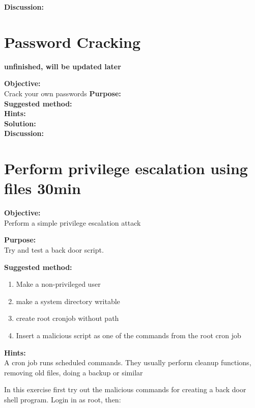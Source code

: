 \documentclass[a4paper,11pt,notitlepage]{report}
\begin{document}
{\bf Discussion:}\\


\chapter{Password Cracking}
\label{ex:pwcrack-101}

{\bf unfinished, will be updated later}

{\bf Objective:}\\

Crack your own passwords
{\bf Purpose:}\\


{\bf Suggested method:}\\


{\bf Hints:}\\


{\bf Solution:}\\


{\bf Discussion:}\\


\chapter{Perform privilege escalation using files 30min}
\label{ex:priv-esc-cron}

{\bf Objective:}\\
Perform a simple privilege escalation attack

{\bf Purpose:}\\
Try and test a back door script.

{\bf Suggested method:}\\

\begin{enumerate}
\item Make a non-privileged user
\item make a system directory writable
\item create root cronjob without path
\item Insert a malicious script as one of the commands from the root cron job
\end{enumerate}

{\bf Hints:}\\
A cron job runs scheduled commands. They usually perform cleanup functions, removing old files, doing a backup or similar

In this exercise first try out the malicious commands for creating a back door shell program. Login in as root, then:
\end{document}
